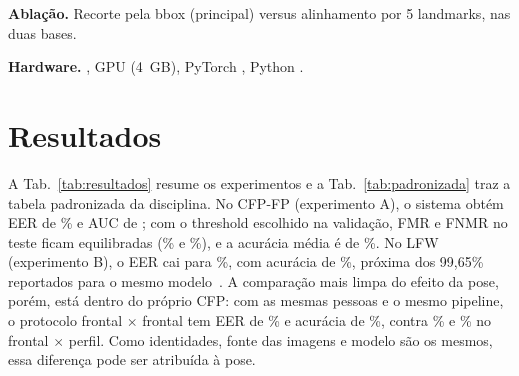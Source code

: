 \documentclass[conference,a4paper]{IEEEtran}
\begin{document}
\textbf{Ablação.} Recorte pela bbox (principal) versus alinhamento por 5 landmarks, nas duas bases.

\textbf{Hardware.} \cpu, GPU \gpu{} (4~GB), PyTorch \torchv, Python \pythonv.

\section{Resultados}
A Tab.~\ref{tab:resultados} resume os experimentos e a Tab.~\ref{tab:padronizada}
traz a tabela padronizada da disciplina. No CFP-FP (experimento A), o
sistema obtém EER de \eerCFP\% e AUC de \aucCFP; com o threshold escolhido na
validação, FMR e FNMR no teste ficam equilibradas (\fmrCFP\% e \fnmrCFP\%), e a
acurácia média é de \accCFP\%. No LFW (experimento B), o EER cai para \eerLFW\%,
com acurácia de \accLFW\%, próxima dos 99,65\% reportados para o mesmo
modelo~\cite{sandberg_facenet}. A comparação mais limpa do efeito da pose, porém,
está dentro do próprio CFP: com as mesmas pessoas e o mesmo pipeline, o protocolo
frontal $\times$ frontal tem EER de \eerFF\% e acurácia de \accFF\%, contra \eerCFP\%
e \accCFP\% no frontal $\times$ perfil. Como identidades, fonte das imagens e modelo
são os mesmos, essa diferença pode ser atribuída à pose.

\begin{table}[t]
\centering
\caption{Resultados de verificação. FMR, FNMR: média $\pm$ desvio-padrão nos 10 folds
de teste, com o threshold da validação; no experimento C, threshold global do CFP-FP.
EER, AUC e TAR@FAR=1\% usam todos os pares.}
\label{tab:resultados}
\end{table}
\end{document}
